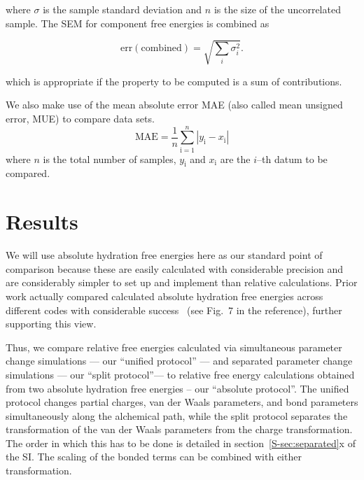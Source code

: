 \documentclass[journal=jctcce,manuscript=article]{achemso}
\begin{document}
where $\sigma$ is the sample standard deviation and $n$ is the size of
the uncorrelated sample.  The SEM for component free energies is combined as

\begin{equation}
  \label{eq:sem-comb}
  \mathrm{err}(\mathrm{combined}) = \sqrt{\sum_i \sigma_i^2}.
\end{equation}

which is appropriate if the property to be computed is a sum of
contributions.

We also make use of the mean absolute error MAE (also called mean unsigned 
error, MUE) to compare data sets.
\begin{equation}
\label{eq:MUE}
\mathrm{MAE} = \frac{1}{n}\sum_\mathrm{i=1}^n \left | y_\mathrm{i} - 
x_\mathrm{i} \right |
\end{equation}
where $n$ is the total number of samples, $y_\mathrm{i}$ and $x_\mathrm{i}$ are 
the $i$--th datum to be compared.


\section{Results}
\label{sec:results}


We will use absolute hydration free energies here as our standard point of 
comparison because these are easily calculated with considerable precision
\cite{doi:10.1021/acs.jced.7b00104} %
and are considerably simpler to set up and implement than relative calculations.
Prior work actually compared calculated absolute hydration free energies across 
different codes with considerable success~\cite{klimovich_predicting_2010} (see 
Fig.~7 in the reference), further supporting this view.

Thus, we compare relative free energies calculated via simultaneous parameter 
change simulations --- our ``unified protocol'' --- and separated parameter 
change simulations --- our ``split protocol''--- to relative free energy 
calculations obtained from two absolute hydration free energies -- our 
``absolute protocol''.
The unified protocol changes partial charges, van der Waals parameters, and 
bond parameters simultaneously along the alchemical path, while the split 
protocol separates the transformation of the van der Waals parameters from the 
charge transformation.  The order in which this has to be done is detailed 
in section~\ref{S-sec:separated}x of the SI.  The scaling of the bonded terms 
can be combined with either transformation.
\end{document}

